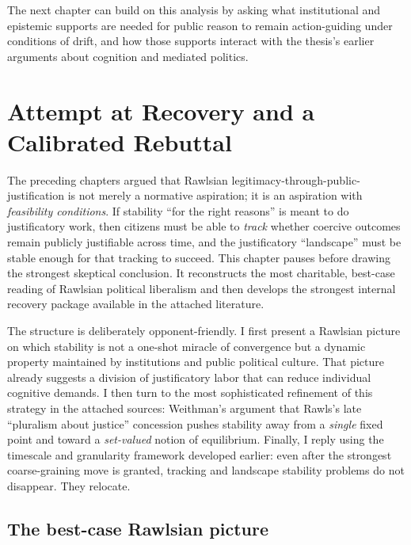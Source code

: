 \documentclass[12pt]{report}
\begin{document}
\noindent The next chapter can build on this analysis by asking what institutional and epistemic supports are needed for public reason to remain action-guiding under conditions of drift, and how those supports interact with the thesis’s earlier arguments about cognition and mediated politics.

\chapter{Attempt at Recovery and a Calibrated Rebuttal}

The preceding chapters argued that Rawlsian legitimacy-through-public-justification is not merely a normative aspiration; it is an aspiration with \emph{feasibility conditions}. If stability ``for the right reasons'' is meant to do justificatory work, then citizens must be able to \emph{track} whether coercive outcomes remain publicly justifiable across time, and the justificatory ``landscape'' must be stable enough for that tracking to succeed. This chapter pauses before drawing the strongest skeptical conclusion. It reconstructs the most charitable, best-case reading of Rawlsian political liberalism and then develops the strongest internal recovery package available in the attached literature.

The structure is deliberately opponent-friendly. I first present a Rawlsian picture on which stability is not a one-shot miracle of convergence but a dynamic property maintained by institutions and public political culture. That picture already suggests a division of justificatory labor that can reduce individual cognitive demands. I then turn to the most sophisticated refinement of this strategy in the attached sources: Weithman’s argument that Rawls’s late ``pluralism about justice'' concession pushes stability away from a \emph{single} fixed point and toward a \emph{set-valued} notion of equilibrium. \parencite[pp.~205--206]{Weithman2023FixedPoints} Finally, I reply using the timescale and granularity framework developed earlier: even after the strongest coarse-graining move is granted, tracking and landscape stability problems do not disappear. They relocate.

\section{The best-case Rawlsian picture}
\end{document}
